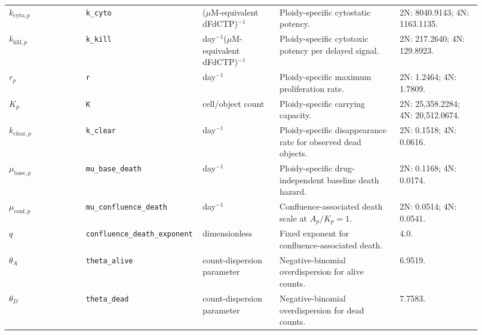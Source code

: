 \begin{center}
\begin{tabular}{p{0.16\linewidth}p{0.18\linewidth}p{0.16\linewidth}p{0.25\linewidth}p{0.17\linewidth}}
$k_{\mathrm{cyto},p}$ & \texttt{k\_cyto} & ($\mu$M-equivalent dFdCTP)$^{-1}$ & Ploidy-specific cytostatic potency. & 2N: 8040.9143; 4N: 1163.1135. \\
$k_{\mathrm{kill},p}$ & \texttt{k\_kill} & day$^{-1}$($\mu$M-equivalent dFdCTP)$^{-1}$ & Ploidy-specific cytotoxic potency per delayed signal. & 2N: 217.2640; 4N: 129.8923. \\
$r_p$ & \texttt{r} & day$^{-1}$ & Ploidy-specific maximum proliferation rate. & 2N: 1.2464; 4N: 1.7809. \\
$K_p$ & \texttt{K} & cell/object count & Ploidy-specific carrying capacity. & 2N: 25,358.2284; 4N: 20,512.0674. \\
$k_{\mathrm{clear},p}$ & \texttt{k\_clear} & day$^{-1}$ & Ploidy-specific disappearance rate for observed dead objects. & 2N: 0.1518; 4N: 0.0616. \\
$\mu_{\mathrm{base},p}$ & \texttt{mu\_base\_death} & day$^{-1}$ & Ploidy-specific drug-independent baseline death hazard. & 2N: 0.1168; 4N: 0.0174. \\
$\mu_{\mathrm{conf},p}$ & \texttt{mu\_confluence\_death} & day$^{-1}$ & Confluence-associated death scale at $A_p/K_p=1$. & 2N: 0.0514; 4N: 0.0541. \\
$q$ & \texttt{confluence\_death\_exponent} & dimensionless & Fixed exponent for confluence-associated death. & 4.0. \\
$\theta_A$ & \texttt{theta\_alive} & count-dispersion parameter & Negative-binomial overdispersion for alive counts. & 6.9519. \\
$\theta_D$ & \texttt{theta\_dead} & count-dispersion parameter & Negative-binomial overdispersion for dead counts. & 7.7583. \\
\hline
\end{tabular}
\end{center}
